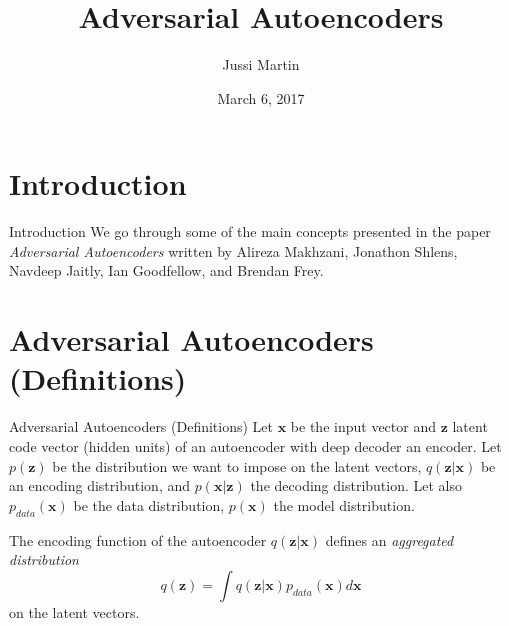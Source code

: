 \documentclass{beamer}
\title[Adversarial Autoencoders]{Adversarial Autoencoders}
\author{Jussi Martin}
\date{March 6, 2017}
\begin{document}
\begin{frame}
  \titlepage
\end{frame}


%
%
%
%
%

\section{Introduction}

\begin{frame}{Introduction}
  We go through some of the main concepts presented in the paper \emph{Adversarial Autoencoders}
  written by Alireza Makhzani, Jonathon Shlens, Navdeep Jaitly, Ian Goodfellow, and Brendan Frey.


\end{frame}

\section{Adversarial Autoencoders (Definitions)}

\begin{frame}{Adversarial Autoencoders (Definitions)}
  Let $\mathbf{x}$ be the input vector and $\mathbf{z}$ latent code vector (hidden units) of an autoencoder
  with deep decoder an encoder. Let $p(\mathbf{z})$ be the distribution we want to impose
  on the latent vectors, $q(\mathbf{z}|\mathbf{x})$ be an encoding distribution, and
  $p(\mathbf{x}|\mathbf{z})$ the decoding distribution. Let also $p_{data}(\mathbf{x})$
  be the data distribution, $p(\mathbf{x})$ the model distribution.

  The encoding function of the autoencoder $q(\mathbf{z}|\mathbf{x})$ defines an
  \emph{aggregated distribution}
  \begin{equation*}
    q(\mathbf{z}) = \int q(\mathbf{z}|\mathbf{x})p_{data}(\mathbf{x})d\mathbf{x}
  \end{equation*}
on the latent vectors.

\end{frame}
\end{document}
